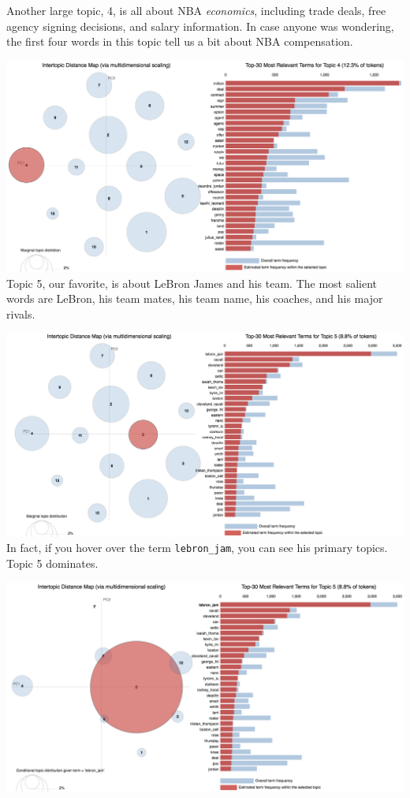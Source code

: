 \documentclass[11pt]{article}
\begin{document}
Another large topic, 4, is all about NBA \textit{economics}, including trade deals, 
free agency signing decisions, and salary information.  In case anyone was wondering, the first four words in this topic tell us a bit about NBA compensation.

\includegraphics[width=470pt]{4.png} \\

Topic 5, our favorite, is about LeBron James and his team.  The most salient words are
LeBron, his team mates, his team name, his coaches, and his major rivals.  

\includegraphics[width=470pt]{5.png} \\

In fact, if you hover over the term \texttt{lebron\_jam}, you can see his primary topics. Topic 5 dominates.

\includegraphics[width=470pt]{5_lebron.png}  \\
\end{document}
